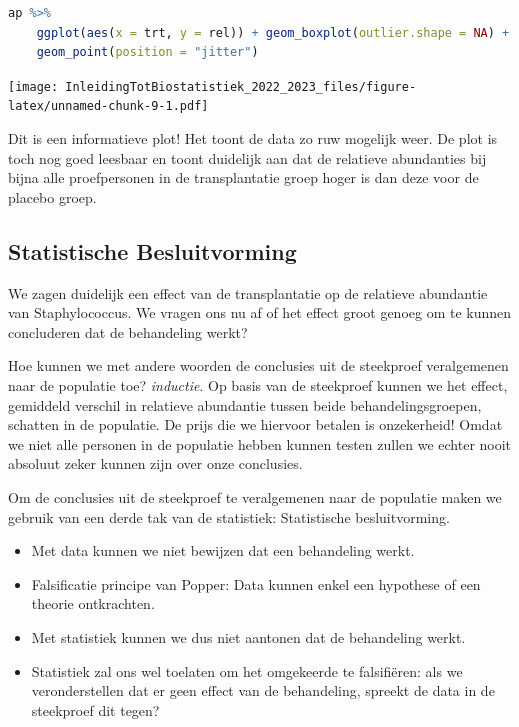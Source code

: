 \documentclass[
  12pt,dutch,coursenotes]{book}
\begin{document}
\begin{lstlisting}[language=R]
ap %>%
    ggplot(aes(x = trt, y = rel)) + geom_boxplot(outlier.shape = NA) +
    geom_point(position = "jitter")
\end{lstlisting}

\texttt{[image: InleidingTotBiostatistiek\_2022\_2023\_files/figure-latex/unnamed-chunk-9-1.pdf]}

Dit is een informatieve plot!
Het toont de data zo ruw mogelijk weer. De plot is toch nog goed leesbaar en toont duidelijk aan dat de relatieve abundanties bij bijna alle proefpersonen in de transplantatie groep hoger is dan deze voor de placebo groep.

\hypertarget{statistische-besluitvorming}{%
\subsection{Statistische Besluitvorming}\label{statistische-besluitvorming}}

We zagen duidelijk een effect van de transplantatie op de relatieve abundantie van Staphylococcus.
We vragen ons nu af of het effect groot genoeg om te kunnen concluderen dat de behandeling werkt?

Hoe kunnen we met andere woorden de conclusies uit de steekproef veralgemenen naar de populatie toe? \emph{inductie}.
Op basis van de steekproef kunnen we het effect, gemiddeld verschil in relatieve abundantie tussen beide behandelingsgroepen, schatten in de populatie.
De prijs die we hiervoor betalen is onzekerheid!
Omdat we niet alle personen in de populatie hebben kunnen testen zullen we echter nooit absoluut zeker kunnen zijn over onze conclusies.

Om de conclusies uit de steekproef te veralgemenen naar de populatie maken we gebruik van een derde tak van de statistiek:
Statistische besluitvorming.

\begin{itemize}
\item
  Met data kunnen we niet bewijzen dat een behandeling werkt.
\item
  Falsificatie principe van Popper: Data kunnen enkel een hypothese of een theorie ontkrachten.
\item
  Met statistiek kunnen we dus niet aantonen dat de behandeling werkt.
\item
  Statistiek zal ons wel toelaten om het omgekeerde te falsifiëren: als we veronderstellen dat er geen effect van de behandeling, spreekt de data in de steekproef dit tegen?
\end{itemize}
\end{document}
